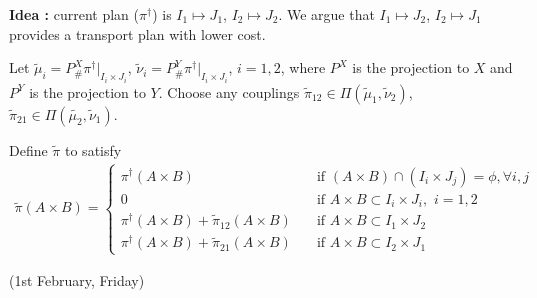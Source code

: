\documentclass[12pt,a4paper]{article}
\newenvironment{proof}
{\begin{changemargin}{1cm}{0.5cm} 
	}%
	{\end{changemargin}
}
\newenvironment{p}
{\begin{proof} 
	}%
	{\end{proof}
}
\begin{document}
\begin{p}
\textbf{Idea :} current plan ($\pi^{\dagger}$) is $I_1 \mapsto J_1$, $I_2 \mapsto J_2$. We argue that $I_1 \mapsto J_2$, $I_2 \mapsto J_1$ provides a transport plan with lower cost.
\s

Let $\tilde{\mu}_i = P_{\#}^X \pi^{\dagger}|_{I_i\times J_i}$, $\tilde{\nu}_i = P_{\#}^Y \pi^{\dagger}|_{I_i\times J_i}$, $i=1,2$, where $P^X$ is the projection to $X$ and $P^Y$ is the projection to $Y$. Choose any couplings $\tilde{\pi}_{12} \in \Pi(\tilde{\mu}_1, \tilde{\nu}_2)$, $\tilde{\pi}_{21} \in \Pi(\tilde{\mu_2}, \tilde{\nu}_1)$.

\quad Define $\tilde{\pi}$ to satisfy
\begin{align*}
\tilde{\pi}(A\times B) = \begin{cases}
\pi^{\dagger}(A\times B) \quad &\text{if } (A\times B) \cap (I_i \times J_j) =\phi, \forall i,j \\
0 \quad &\text{if } A\times B \subset I_i \times J_i,\,\, i=1,2 \\
\pi^{\dagger} (A\times B) + \tilde{\pi}_{12}(A\times B) \quad &\text{if } A\times B \subset I_1\times J_2\\
\pi^{\dagger}(A\times B) + \tilde{\pi}_{21}(A\times B) \quad &\text{if } A\times B \subset I_2\times J_1 
\end{cases}
\end{align*}
\end{p}
\s

\newday

(1st February, Friday)
\s
\end{document}
